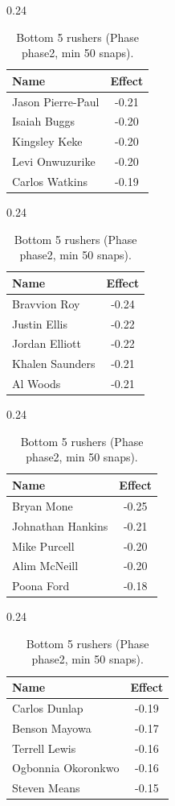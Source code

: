 \begin{table}[h!]
\centering
\begin{subtable}{0.24\textwidth}
\centering
\footnotesize
\begin{tabular}{lc}
\toprule
Name & Effect \\
\midrule
Jason Pierre-Paul & -0.21 \\
Isaiah Buggs & -0.20 \\
Kingsley Keke & -0.20 \\
Levi Onwuzurike & -0.20 \\
Carlos Watkins & -0.19 \\
\bottomrule
\end{tabular}
\caption{DE}
\end{subtable}
\hfill
\begin{subtable}{0.24\textwidth}
\centering
\footnotesize
\begin{tabular}{lc}
\toprule
Name & Effect \\
\midrule
Bravvion Roy & -0.24 \\
Justin Ellis & -0.22 \\
Jordan Elliott & -0.22 \\
Khalen Saunders & -0.21 \\
Al Woods & -0.21 \\
\bottomrule
\end{tabular}
\caption{DT}
\end{subtable}
\hfill
\begin{subtable}{0.24\textwidth}
\centering
\footnotesize
\begin{tabular}{lc}
\toprule
Name & Effect \\
\midrule
Bryan Mone & -0.25 \\
Johnathan Hankins & -0.21 \\
Mike Purcell & -0.20 \\
Alim McNeill & -0.20 \\
Poona Ford & -0.18 \\
\bottomrule
\end{tabular}
\caption{NT}
\end{subtable}
\hfill
\begin{subtable}{0.24\textwidth}
\centering
\footnotesize
\begin{tabular}{lc}
\toprule
Name & Effect \\
\midrule
Carlos Dunlap & -0.19 \\
Benson Mayowa & -0.17 \\
Terrell Lewis & -0.16 \\
Ogbonnia Okoronkwo & -0.16 \\
Steven Means & -0.15 \\
\bottomrule
\end{tabular}
\caption{OLB}
\end{subtable}
\caption{Bottom 5 rushers (Phase phase2, min 50 snaps).}
\label{tab:rusher_pm_phase2_bot}
\end{table}

